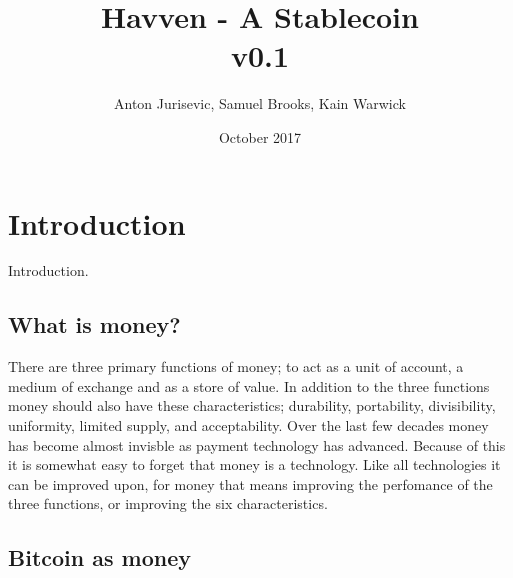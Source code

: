 \documentclass{article}
\begin{document}
\newcommand{\CUR}{\textsc{cur}}
\newcommand{\NOM}{\textsc{nom}}


\title{Havven - A Stablecoin \\ v0.1}
\author{Anton Jurisevic, Samuel Brooks, Kain Warwick}
\date{October 2017}


\begin{figure}
    \centering
    
\end{figure}
\maketitle

\section{Introduction}

Introduction. \\

\subsection{What is money?}

There are three primary functions of money; to act as a unit of account, a medium of exchange and as a store of value. In addition to the three functions money should also have these characteristics; durability, portability, divisibility, uniformity, limited supply, and acceptability. Over the last few decades money has become almost invisble as payment technology has advanced. Because of this it is somewhat easy to forget that money is a technology. Like all technologies it can be improved upon, for money that means improving the perfomance of the three functions, or improving the six characteristics. 

\subsection{Bitcoin as money}
\end{document}
